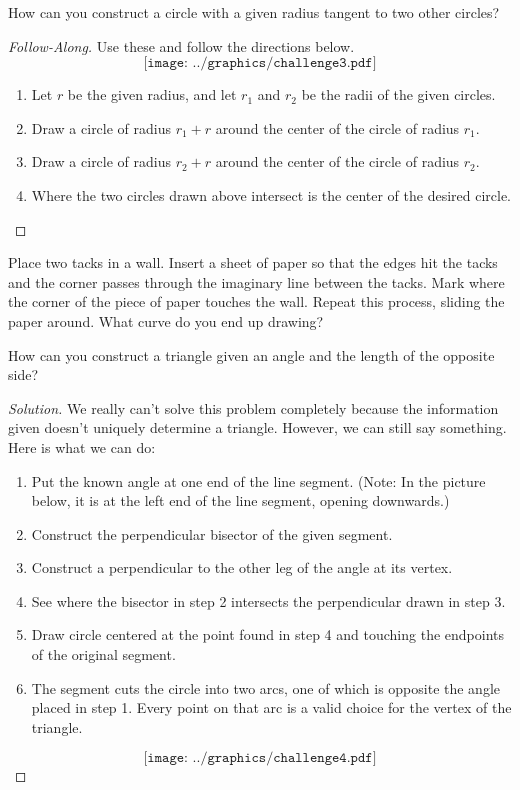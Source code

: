 \begin{question} How can you construct a circle with a given radius tangent 
to two other circles?
\end{question}

\begin{proof}[Follow-Along]
Use these and follow the directions below.
\[
\texttt{[image: ../graphics/challenge3.pdf]}
\]
\begin{enumerate}
\item Let $r$ be the given radius, and let $r_1$ and $r_2$ be the
  radii of the given circles.
\item Draw a circle of radius $r_1 + r$ around the center of the
  circle of radius $r_1$.
\item Draw a circle of radius $r_2 + r$ around the center of the
  circle of radius $r_2$.
\item Where the two circles drawn above intersect is the center of the
  desired circle.
\end{enumerate}
\end{proof}


\begin{question} 
Place two tacks in a wall. Insert a sheet of paper so that the edges
hit the tacks and the corner passes through the imaginary line between
the tacks. Mark where the corner of the piece of paper touches the
wall. Repeat this process, sliding the paper around. What curve do you
end up drawing?
\end{question}
\QM

\begin{question} How can you construct a triangle given an angle and the 
length of the opposite side?
\end{question}

\begin{proof}[Solution] 
We really can't solve this problem completely because the information
given doesn't uniquely determine a triangle. However, we can still say
something. Here is what we can do:
\begin{enumerate}
\item Put the known angle at one end of the line segment. (Note: In the
  picture below, it is at the left end of the line segment, opening downwards.)
\item Construct the perpendicular bisector of the given segment.
\item Construct a perpendicular to the other leg of the angle at its vertex.
\item See where the bisector in step 2 intersects the perpendicular drawn in step 3.
\item Draw circle centered at the point found in step 4 and
  touching the endpoints of the original segment.
\item The segment cuts the circle into two arcs, one of which is opposite the
angle placed in step 1.  Every point on that arc is a valid choice for the vertex of the triangle.
\end{enumerate}
\[
\texttt{[image: ../graphics/challenge4.pdf]}
\]
\end{proof}


